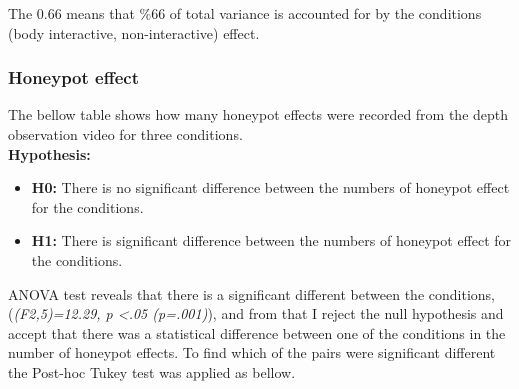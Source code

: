 The 0.66 means that \%66 of total variance is accounted for by the conditions (body interactive, non-interactive) effect.



\subsubsection {Honeypot effect}
The bellow table shows how many honeypot effects were recorded from the depth observation video for three conditions.\\

\textbf{Hypothesis: }
\begin{itemize}
\item \textbf{H0:} There is no significant difference between the numbers of honeypot effect for the conditions.
\item \textbf{H1:} There is significant difference between the numbers of honeypot effect for the conditions.
\end{itemize}


\begin{table}[H]
\caption{Number of Honeypot effect in three weeks}
\label{tab:landingeffectthreeweeks}
\centering
{}
\end{table}


ANOVA test reveals that there is a significant different between the conditions,(\emph{(F2,5)=12.29, p <.05 (p=.001)}), and from that I reject the null hypothesis and accept that there was a statistical difference between one of the conditions in the number of honeypot effects. To find which of the pairs were significant different the Post-hoc Tukey test was applied as bellow. 

\begin{table}[H]
\caption{Post-Hoc Tukey’s HSD results}
\label{tab:honeypot-non-posthoctukey}
\centering
{}
\end{table}

